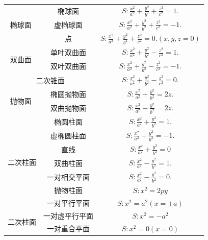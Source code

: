 \begin{center}
\begin{longtable}{|l|c|c|}
			\multirow{3}{*}{$\,\,$椭球面}   & 椭球面     &   $ S:\displaystyle \frac{x^2}{a^2}+\frac{y^2}{b^2}+\frac{z^2}{c^2}=1. $ \\
			\cline{2-3}
			& 虚椭球面    &  $ S:\displaystyle \frac{x^2}{a^2}+\frac{y^2}{b^2}+\frac{z^2}{c^2}=-1. $   \\
			\cline{2-3}
			& 点       &   $ S:\displaystyle \frac{x^2}{a^2}+\frac{y^2}{b^2}+\frac{z^2}{c^2}=0.(x,y,z=0) $  \\
			\hline
			\multirow{2}{*}{$\,\,$双曲面} & 单叶双曲面   &  $ S:\displaystyle \frac{x^2}{a^2}+\frac{y^2}{b^2}-\frac{z^2}{c^2}=1. $   \\
			\cline{2-3}
			& 双叶双曲面   &   $ S:\displaystyle \frac{x^2}{a^2}+\frac{y^2}{b^2}-\frac{z^2}{c^2}=-1. $ \\
			\hline
			\multicolumn{2}{|c|}{二次锥面}&    \label{二次锥面} \index{ECZM1@二次锥面}         $ S:\displaystyle \frac{x^2}{a^2}+\frac{y^2}{b^2}-\frac{z^2}{c^2}=0. $ \\
			\hline
			\multirow{2}{*}{$\,\,$抛物面}  & 椭圆抛物面   &    $ S:\displaystyle \frac{x^2}{a^2}+\frac{y^2}{b^2}=2z. $\\
			\cline{2-3}
			& 双曲抛物面   &  $ S:\displaystyle \frac{x^2}{a^2}-\frac{y^2}{b^2}=2z. $  \\
			\hline
			\multirow{7}{*}{二次柱面} \label{二次柱面} \index{ECZM2@二次柱面} & 椭圆柱面  \label{椭圆柱面} \index{ECZM2@二次柱面!TYZM@椭圆柱面}  &  $ S:\displaystyle \frac{x^2}{a^2}+\frac{y^2}{b^2}=1. $  \\
			\cline{2-3}
			& 虚椭圆柱面 \label{虚椭圆柱面} \index{ECZM2@二次柱面!XTYZM@虚椭圆柱面}  &   $ S:\displaystyle \frac{x^2}{a^2}+\frac{y^2}{b^2}=-1. $ \\
			\cline{2-3}
			& 直线    &  $ S:\displaystyle \frac{x^2}{a^2}+\frac{y^2}{b^2}=0 $  \\
			\cline{2-3}
			& 双曲柱面  \label{双曲柱面} \index{ECZM2@二次柱面!SQZM@双曲柱面}  &  $ S:\displaystyle \frac{x^2}{a^2}-\frac{y^2}{b^2}=1. $  \\
			\cline{2-3}
			& 一对相交平面  & $ S:\displaystyle \frac{x^2}{a^2}-\frac{y^2}{b^2}=0. $   \\
			\cline{2-3}
			& 抛物柱面 \label{抛物柱面} \index{ECZM2@二次柱面!PWZM@抛物柱面}   &  $ S:\displaystyle x^2=2py $  \\
			\cline{2-3}
			& 一对平行平面  &  $ S:\displaystyle x^2=a^2  (x= \pm a)$   \\
			\multirow{2}{*}{二次柱面} & 一对虚平行平面 &  $ S:\displaystyle x^2=-a^2$  \\
			\cline{2-3}
			& 一对重合平面  &   $ S:\displaystyle x^2=0(x=0)$ \\
		\end{longtable}
	\end{center}
	\renewcommand\arraystretch{1}
	\vspace*{-4em}
